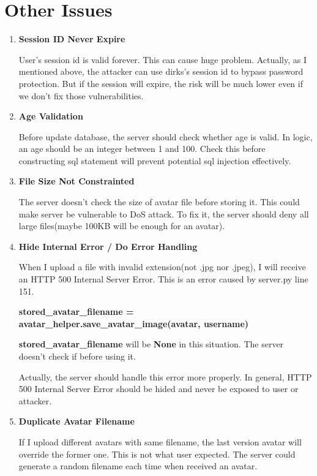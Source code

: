 \documentclass[11pt]{article}
\newenvironment{qparts}{\begin{enumerate}[{(}a{)}]}{\end{enumerate}}
\begin{document}
\section{Other Issues}
\begin{qparts}
	
	\item \textbf{Session ID Never Expire}
	
	User's session id is valid forever. This can cause huge problem. Actually, as I mentioned above, the attacker can use dirks's session id to bypass password protection. But if the session will expire, the risk will be much lower even if we don't fix those vulnerabilities.
	
	\item \textbf{Age Validation}
	
	Before update database, the server should check whether age is valid. In logic, an age should be an integer between 1 and 100. Check this before constructing sql statement will prevent potential sql injection effectively.
	
	\item \textbf{File Size Not Constrainted}
	
	The server doesn't check the size of avatar file before storing it. This could make server be vulnerable to DoS attack. To fix it, the server should deny all large files(maybe 100KB will be enough for an avatar).
	
	\item \textbf{Hide Internal Error / Do Error Handling}
	
	When I upload a file with invalid extension(not .jpg nor .jpeg), I will receive an HTTP 500 Internal Server Error. This is an error caused by server.py line 151.
	
	\textbf{stored\_avatar\_filename = avatar\_helper.save\_avatar\_image(avatar, username)}
	
	\textbf{stored\_avatar\_filename} will be \textbf{None} in this situation. The server doesn't check if before using it.
	
	Actually, the server should handle this error more properly. In general, HTTP 500 Internal Server Error should be hided and never be exposed to user or attacker.
	
	\item \textbf{Duplicate Avatar Filename}
	
	If I upload different avatars with same filename, the last version avatar will override the former one. This is not what user expected. The server could generate a random filename each time when received an avatar.


\end{qparts}
\end{document}
